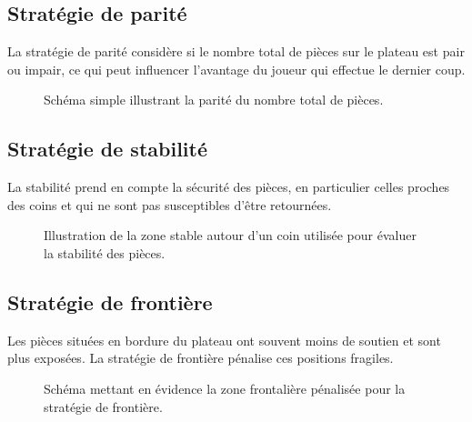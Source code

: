 \documentclass[a4paper,12pt]{article}
\begin{document}
\subsection{Stratégie de parité}
La stratégie de parité considère si le nombre total de pièces sur le plateau est pair ou impair, ce qui peut influencer l'avantage du joueur qui effectue le dernier coup.
\begin{figure}[H]
\centering
{}
\caption{Schéma simple illustrant la parité du nombre total de pièces.}
\label{fig:parity}
\end{figure}

\subsection{Stratégie de stabilité}
La stabilité prend en compte la sécurité des pièces, en particulier celles proches des coins et qui ne sont pas susceptibles d'être retournées.
\begin{figure}[H]
\centering
{}
\caption{Illustration de la zone stable autour d'un coin utilisée pour évaluer la stabilité des pièces.}
\label{fig:stability}
\end{figure}

\subsection{Stratégie de frontière}
Les pièces situées en bordure du plateau ont souvent moins de soutien et sont plus exposées. La stratégie de frontière pénalise ces positions fragiles.
\begin{figure}[H]
\centering
{}
\caption{Schéma mettant en évidence la zone frontalière pénalisée pour la stratégie de frontière.}
\label{fig:frontier}
\end{figure}
\end{document}
